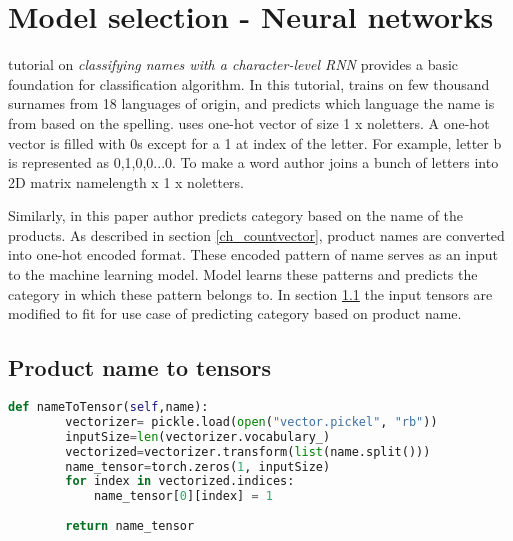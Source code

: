 \chapter{Model selection - Neural networks}

\parencite{sean} tutorial on \textit{classifying names with a character-level \acs{RNN}} provides a basic foundation for classification algorithm. In this tutorial,  trains on few thousand surnames from 18 languages of origin, and predicts which language the name is from based on the spelling.  uses one-hot vector of size 1 x no\textunderscore letters. A one-hot vector is filled with 0s except for a 1 at index of the letter. For example, letter b is represented as 0,1,0,0...0. To make a word author joins a bunch of letters into 2D matrix name\textunderscore length x 1 x no\textunderscore letters. 


Similarly, in this paper author predicts category based on the name of the products. As described in section \ref{ch_countvector}, product names are converted into one-hot encoded format. These encoded pattern of name serves as an input to the machine learning model. Model learns these patterns and predicts the category in which these pattern belongs to. In section \ref{nametotensor} the input tensors are modified to fit for use case of predicting category based on product name.  

\section{Product name to tensors} \label{nametotensor}

\begin{lstlisting}[language=Python,label=productnametotensor, caption={Convert product name to tensors}]
    def nameToTensor(self,name):
        vectorizer= pickle.load(open("vector.pickel", "rb"))
        inputSize=len(vectorizer.vocabulary_)
        vectorized=vectorizer.transform(list(name.split()))
        name_tensor=torch.zeros(1, inputSize)
        for index in vectorized.indices:
            name_tensor[0][index] = 1
        
        return name_tensor
\end{lstlisting}

